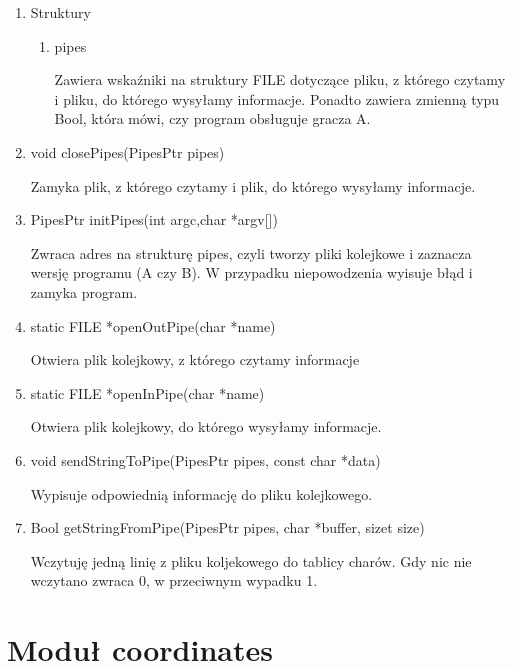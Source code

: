 \documentclass{article}
\begin{document}
\begin{enumerate}

\item Struktury

\begin{enumerate}

\item pipes

Zawiera wskaźniki na struktury FILE dotyczące pliku, z którego czytamy i pliku, do którego wysyłamy informacje. Ponadto zawiera zmienną typu \textunderscore Bool, która mówi, czy program obsługuje gracza A.


\end{enumerate}

\item void closePipes(PipesPtr pipes)

Zamyka plik, z którego czytamy i plik, do którego wysyłamy informacje.

\item PipesPtr initPipes(int argc,char *argv[])

Zwraca adres na strukturę pipes, czyli tworzy pliki kolejkowe i zaznacza wersję programu (A czy B). W przypadku niepowodzenia wyisuje błąd i zamyka program.

\item static FILE *openOutPipe(char *name)

Otwiera plik kolejkowy, z którego czytamy informacje

\item static FILE *openInPipe(char *name)

Otwiera plik kolejkowy, do którego wysyłamy informacje.

\item void sendStringToPipe(PipesPtr pipes, const char *data)

Wypisuje odpowiednią informację do pliku kolejkowego.

\item \textunderscore Bool getStringFromPipe(PipesPtr pipes, char *buffer, size\textunderscore t size)

Wczytuję jedną linię z pliku koljekowego do tablicy charów. Gdy nic nie wczytano zwraca 0, w przeciwnym wypadku 1.


\end{enumerate}

\section{Moduł coordinates}
\end{document}
